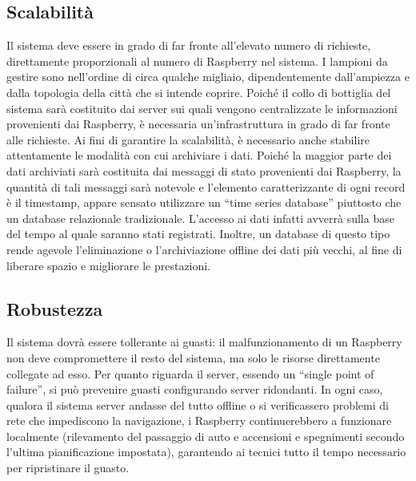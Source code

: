 \subsection{Scalabilità}
Il sistema deve essere in grado di far fronte all'elevato numero di richieste, direttamente proporzionali al numero di Raspberry nel sistema. I lampioni da gestire sono nell'ordine di circa qualche migliaio, dipendentemente dall'ampiezza e dalla topologia della città che si intende coprire. Poiché il collo di bottiglia del sistema sarà costituito dai server sui quali vengono centralizzate le informazioni provenienti dai Raspberry, è necessaria un'infrastruttura in grado di far fronte alle richieste.
Ai fini di garantire la scalabilità, è necessario anche stabilire attentamente le modalità con cui archiviare i dati. Poiché la maggior parte dei dati archiviati sarà costituita dai messaggi di stato provenienti dai Raspberry, la quantità di tali messaggi sarà notevole e l'elemento caratterizzante di ogni record è il timestamp, appare sensato utilizzare un ``time series database'' piuttosto che un database relazionale tradizionale. L'accesso ai dati infatti avverrà sulla base del tempo al quale saranno stati registrati. Inoltre, un database di questo tipo rende agevole l'eliminazione o l'archiviazione offline dei dati più vecchi, al fine di liberare spazio e migliorare le prestazioni.
\subsection{Robustezza}
Il sistema dovrà essere tollerante ai guasti: il malfunzionamento di un Raspberry non deve compromettere il resto del sistema, ma solo le risorse direttamente collegate ad esso. Per quanto riguarda il server, essendo un ``single point of failure'', si può prevenire guasti configurando server ridondanti. In ogni caso, qualora il sistema server andasse del tutto offline o si verificassero problemi di rete che impediscono la navigazione, i Raspberry continuerebbero a funzionare localmente (rilevamento del passaggio di auto e accensioni e spegnimenti secondo l'ultima pianificazione impostata), garantendo ai tecnici tutto il tempo necessario per ripristinare il guasto.
